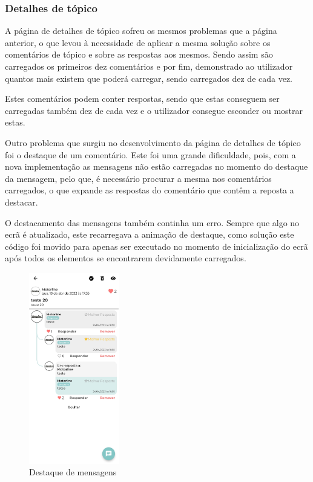 \subsubsection{Detalhes de tópico}

A página de detalhes de tópico sofreu os mesmos problemas que a página anterior, o que levou à necessidade de aplicar a mesma solução sobre os comentários de tópico e sobre as respostas aos mesmos. Sendo assim são carregados os primeiros dez comentários e por fim, demonstrado ao utilizador quantos mais existem que poderá carregar, sendo carregados dez de cada vez.

Estes comentários podem conter respostas, sendo que estas conseguem ser carregadas também dez de cada vez e o utilizador consegue esconder ou mostrar estas.

Outro problema que surgiu no desenvolvimento da página de detalhes de tópico foi o destaque de um comentário. Este foi uma grande dificuldade, pois, com a nova implementação as mensagens não estão carregadas no momento do destaque da mensagem, pelo que, é necessário procurar a mesma nos comentários carregados, o que expande as respostas do comentário que contêm a reposta a destacar.

O destacamento das mensagens também continha um erro. Sempre que algo no ecrã é atualizado, este recarregava a animação de destaque, como solução este código foi movido para apenas ser executado no momento de inicialização do ecrã após todos os elementos se encontrarem devidamente carregados.

\begin{figure}[htb]
 \centering
 \includegraphics[width=0.35\textwidth]{images/implementacao/frontend/forum/loading_topics/1686062701127.jpg}
 \caption{Destaque de mensagens}
 \label{fig:75}
\end{figure}